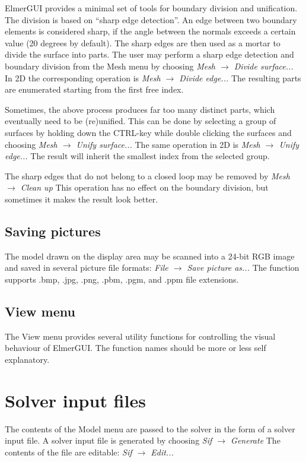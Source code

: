 \documentclass[a4paper,12pt]{article}
\newcommand{\menu}[2]{{\it \vskip2mm #1 $\rightarrow$ #2 \vskip2mm}}
\begin{document}
ElmerGUI provides a minimal set of tools for boundary division and unification. The
division is based on ``sharp edge detection''. An edge between two boundary elements
is considered sharp, if the angle between the normals exceeds a certain value (20
degrees by default). The sharp edges are then used as a mortar to divide the surface
into parts. The user may perform a sharp edge detection and boundary division from
the Mesh menu by choosing
\menu{Mesh}{Divide surface...}
\noindent In 2D the corresponding operation is
\menu{Mesh}{Divide edge...}
\noindent The resulting parts are enumerated starting from the first free index.

Sometimes, the above process produces far too many distinct parts, which eventually
need to be (re)unified. This can be done by selecting a group of surfaces by holding
down the CTRL-key while double clicking the surfaces and choosing
\menu{Mesh}{Unify surface...}
\noindent The same operation in 2D is
\menu{Mesh}{Unify edge...}
\noindent The result will inherit the smallest index from the selected group.

The sharp edges that do not belong to a closed loop may be removed by
\menu{Mesh}{Clean up}
\noindent This operation has no effect on the boundary division, but sometimes it makes
the result look better.

\subsection{Saving pictures}

The model drawn on the display area may be scanned into a 24-bit RGB image and saved in
several picture file formats:
\menu{File}{Save picture as...}
\noindent The function supports .bmp, .jpg, .png, .pbm, .pgm, and .ppm file extensions.

\subsection{View menu}

The View menu provides several utility functions for controlling the visual behaviour
of ElmerGUI. The function names should be more or less self explanatory.

\section{Solver input files}

The contents of the Model menu are passed to the solver in the form of a solver
input file. A solver input file is generated by choosing
\menu{Sif}{Generate}
\noindent The contents of the file are editable:
\menu{Sif}{Edit...}
\end{document}
